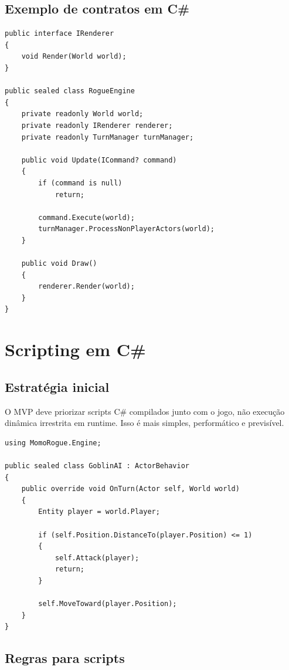 \documentclass[12pt,a4paper]{article}
\begin{document}
\subsection{Exemplo de contratos em C\#}

\begin{lstlisting}[language={[Sharp]C},caption={Exemplo conceitual de contrato de renderer.}]
public interface IRenderer
{
    void Render(World world);
}

public sealed class RogueEngine
{
    private readonly World world;
    private readonly IRenderer renderer;
    private readonly TurnManager turnManager;

    public void Update(ICommand? command)
    {
        if (command is null)
            return;

        command.Execute(world);
        turnManager.ProcessNonPlayerActors(world);
    }

    public void Draw()
    {
        renderer.Render(world);
    }
}
\end{lstlisting}

\section{Scripting em C\#}

\subsection{Estratégia inicial}

O MVP deve priorizar scripts C\# compilados junto com o jogo, não execução dinâmica irrestrita em runtime. Isso é mais simples, performático e previsível.

\begin{lstlisting}[language={[Sharp]C},caption={Exemplo de comportamento de inimigo em C\#.}]
using MomoRogue.Engine;

public sealed class GoblinAI : ActorBehavior
{
    public override void OnTurn(Actor self, World world)
    {
        Entity player = world.Player;

        if (self.Position.DistanceTo(player.Position) <= 1)
        {
            self.Attack(player);
            return;
        }

        self.MoveToward(player.Position);
    }
}
\end{lstlisting}

\subsection{Regras para scripts}
\end{document}
